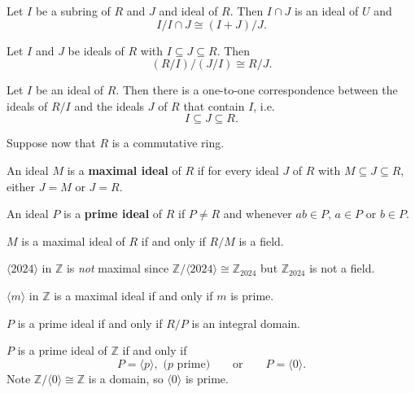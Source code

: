 \begin{theorem}
	Let $I$ be a subring of $R$ and $J$ and ideal of $R$. Then $I\cap J$ is an ideal of $U$ and
	$$I/I\cap J\cong (I+J)/J.$$
\end{theorem}

\begin{theorem}
	Let $I$ and $J$ be ideals of $R$ with $I\subseteq J\subseteq R$. Then
	$$(R/I)/(J/I)\cong R/J.$$
\end{theorem}

\begin{theorem}
	Let $I$ be an ideal of $R$. Then there is a one-to-one correspondence between the ideals of $R/I$ and the ideals $J$ of $R$ that contain $I$, i.e.
	$$I\subseteq J\subseteq R.$$
\end{theorem}

Suppose now that $R$ is a commutative ring.

\begin{definition}
	An ideal $M$ is a \textbf{maximal ideal} of $R$ if for every ideal $J$ of $R$ with $M\subseteq J\subseteq R$, either $J=M$ or $J=R$.
\end{definition}

\begin{definition}
	An ideal $P$ is a \textbf{prime ideal} of $R$ if $P\neq R$ and whenever $ab\in P$, $a\in P$ or $b\in P$.
\end{definition}

\begin{theorem}
	$M$ is a maximal ideal of $R$ if and only if $R/M$ is a field.
\end{theorem}

\begin{example}
	$\langle 2024\rangle$ in $\mathbb Z$ is \textit{not} maximal since $\mathbb Z/\langle 2024\rangle\cong\mathbb Z_{2024}$ but $\mathbb Z_{2024}$ is not a field.
\end{example}

\begin{example}
	$\langle m\rangle$ in $\mathbb Z$ is a maximal ideal if and only if $m$ is prime.
\end{example}

\begin{theorem}
	$P$ is a prime ideal if and only if $R/P$ is an integral domain.
\end{theorem}

\begin{example}
	$P$ is a prime ideal of $\mathbb Z$ if and only if
	$$P=\langle p\rangle,\text{ ($p$ prime)}\qquad\text{or}\qquad P=\langle 0\rangle.$$
	Note $\mathbb Z/\langle 0\rangle\cong\mathbb Z$ is a domain, so $\langle 0\rangle$ is prime.
\end{example}

